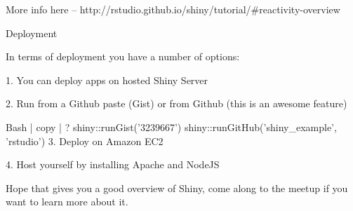 \documentclass[]{article}
\begin{document}
More info here – http://rstudio.github.io/shiny/tutorial/#reactivity-overview

Deployment

In terms of deployment you have a number of options:

1. You can deploy apps on hosted Shiny Server

2. Run from a Github paste (Gist) or from Github (this is an awesome feature)

 Bash | 		 copy |	?	 
shiny::runGist('3239667')
shiny::runGitHub('shiny_example', 'rstudio')
3. Deploy on Amazon EC2

4. Host yourself by installing Apache and NodeJS

Hope that gives you a good overview of Shiny, come along to the meetup if you want to learn more about it.
\end{document}
